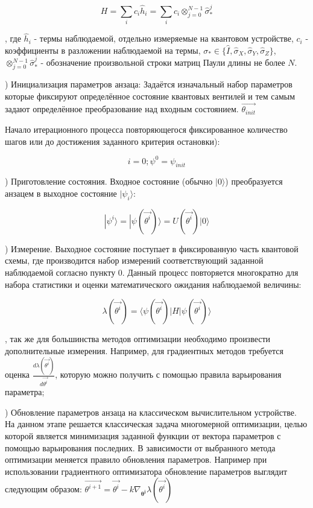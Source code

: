 \documentclass[12pt]{extarticle}
\begin{document}
\begin{equation}
 H=\sum_{i} c_{i} \hat h_{i} = \sum_{i} c_{i} \otimes^{N-1}_{j = 0} \hat \sigma^{j}_{*} 
\end{equation}

, где $\hat h_{i}$ - термы наблюдаемой, отдельно измеряемые на квантовом устройстве, $c_{i}$ - коэффициенты в разложении наблюдаемой на термы, $ \sigma_{*} \in \{\hat I,\hat \sigma_{X}, \hat \sigma_{Y}, \hat \sigma_{Z}  \} $, $\otimes^{N-1}_{j = 0} \hat \sigma^{j}_{*}$ - обозначение произвольной строки матриц Паули длины не более $N$.

) Инициализация параметров анзаца:
Задаётся изначальный набор параметров которые фиксируют определённое состояние квантовых вентилей и тем самым задают определённое преобразование над входным состоянием. $\vec{\theta_{init}}$

\qquad Начало итерационного процесса повторяющегося фиксированное количество шагов или до достижения заданного критерия остановки):

\begin{equation}
i = 0; \psi^{0} = \psi_{init}
\end{equation}

) Приготовление состояния. Входное состояние (обычно $|0 \rangle$) преобразуется анзацем в выходное состояние $|\psi_{i}\rangle$:


\begin{equation}
|\psi^{i}\rangle = |\psi (\vec{\theta^{i}})\rangle = U(\vec{\theta^{i}}) |0 \rangle
\end{equation}



) Измерение. Выходное состояние поступает в фиксированную часть квантовой схемы, где производится набор измерений соответствующий заданной наблюдаемой согласно пункту 0. Данный процесс повторяется многократно для набора статистики и оценки математического ожидания наблюдаемой величины:

\begin{equation}
\lambda(\vec{\theta^{i}}) = \langle \psi(\vec{\theta^{i}}) |H|\psi(\vec{\theta^{i}})\rangle
\end{equation}

, так же для большинства методов оптимизации необходимо произвести дополнительные измерения. Например, для градиентных методов требуется оценка $ \frac{d\lambda(\vec{\theta^{i}})}{d\vec{\theta^{i}}} $, которую можно получить с помощью правила варьирования параметра;

) Обновление параметров анзаца на классическом вычислительном устройстве.
На данном этапе решается классическая задача многомерной оптимизации, целью которой является минимизация заданной функции от вектора параметров с помощью варьирования последних. В зависимости от выбранного метода оптимизации меняется правило обновления параметров. Например при использовании градиентного оптимизатора обновление параметров выглядит следующим образом:
$ \vec{\theta^{i+1}} = \vec{\theta^{i}} - k \nabla_{\mathbf{\theta^{i}}} \lambda(\vec{\theta^{i}})$
\end{document}
